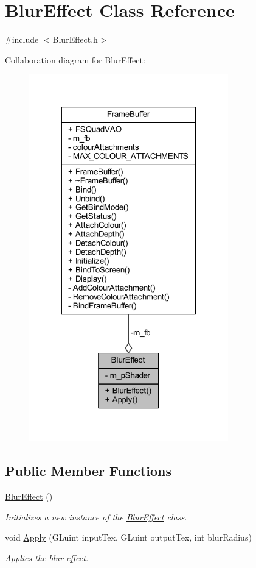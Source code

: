 \hypertarget{class_blur_effect}{}\section{Blur\+Effect Class Reference}
\label{class_blur_effect}


{\ttfamily \#include $<$Blur\+Effect.\+h$>$}



Collaboration diagram for Blur\+Effect\+:\nopagebreak
\begin{figure}[H]
\begin{center}
\leavevmode
\includegraphics[width=245pt]{class_blur_effect__coll__graph}
\end{center}
\end{figure}
\subsection*{Public Member Functions}
\begin{DoxyCompactItemize}
\item 
\hyperlink{class_blur_effect_aad277452b90533f33dbd42bd55b8ed78}{Blur\+Effect} ()
\begin{DoxyCompactList}\small\item\em Initializes a new instance of the \hyperlink{class_blur_effect}{Blur\+Effect} class. \end{DoxyCompactList}\item 
void \hyperlink{class_blur_effect_af9aced52cdc0360bf8a424cf49802d92}{Apply} (G\+Luint input\+Tex, G\+Luint output\+Tex, int blur\+Radius)
\begin{DoxyCompactList}\small\item\em Applies the blur effect. \end{DoxyCompactList}\end{DoxyCompactItemize}
